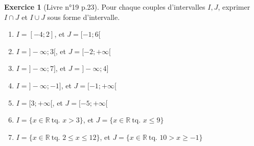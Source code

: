\documentclass[a4paper, 14pt]{extarticle}
\theoremstyle{plain}
\theoremstyle{definition}
\newtheorem{ex}{Exercice}
\newcommand{\R}{\mathbb{R}}
\begin{document}
\begin{ex}[Livre n°19 p.23]
	Pour chaque couples d'intervalles $I,J$, exprimer $I \cap J$ et $I \cup J$ sous forme d'intervalle.
	\begin{enumerate}\itemsep10pt
		\item $I = [-4 ; 2]$, et $J = [-1 ; 6[$
		\item $ I = ] {-}\infty ; 3 [$, et $J =[-2 ; {+}\infty[$ 
		\item $I = ]{-}\infty ; 7]$, et $J =]{-}\infty ; 4]$
		\item $I = ]{-}\infty ; -1]$, et $J = [-1 ; {+}\infty [$
		\item $I = [3 ; {+}\infty [$, et $J = [-5 ; {+}\infty [$
		\item $I = \{ x \in \R \ \text{tq. } x > 3 \}$, et $J = \{ x \in \R \ \text{tq. } x \leq 9 \}$
		\item $I = \{ x \in \R \ \text{tq. } 2 \leq x \leq 12 \}$, et $J = \{ x \in \R \ \text{tq. } 10 > x \geq -1 \}$
	\end{enumerate}
\end{ex}
\end{document}

